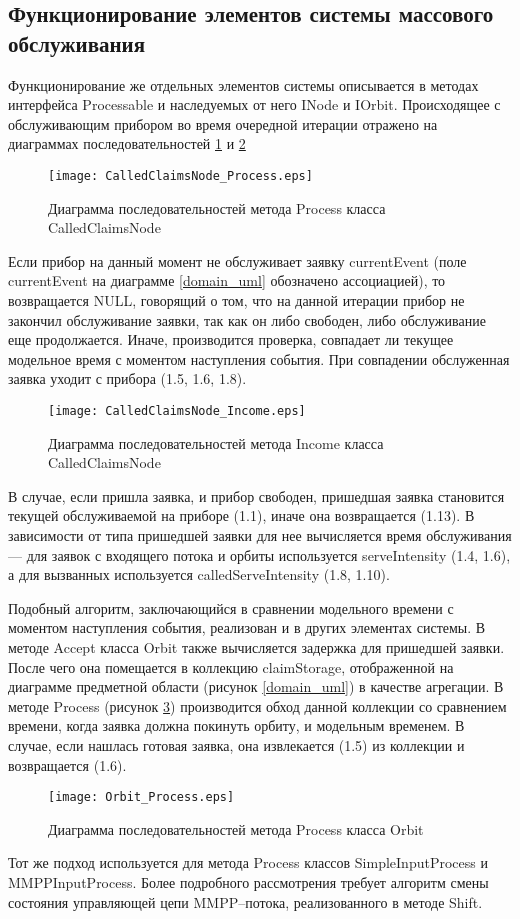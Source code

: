 \subsection{Функционирование элементов системы массового обслуживания}
Функционирование же отдельных элементов системы описывается в методах интерфейса Processable и наследуемых от него INode и IOrbit.
Происходящее с обслуживающим прибором во время очередной итерации отражено на диаграммах последовательностей \ref{CalledClaimsNode_Process_uml} и \ref{CalledClaimsNode_Income_uml}
\begin{figure}[H]
	\centering
	\texttt{[image: CalledClaimsNode\_Process.eps]}
	\caption{Диаграмма последовательностей метода Process класса CalledClaimsNode}
	\label{CalledClaimsNode_Process_uml}
\end{figure}
Если прибор на данный момент не обслуживает заявку currentEvent (поле currentEvent на диаграмме \ref{domain_uml} обозначено ассоциацией), то возвращается NULL, говорящий о том, что на данной итерации прибор не закончил обслуживание заявки, так как он либо свободен, либо обслуживание еще продолжается. Иначе, производится проверка, совпадает ли текущее модельное время с моментом наступления события. При совпадении обслуженная заявка уходит с прибора (1.5, 1.6, 1.8).
\begin{figure}[H]
	\centering
	\texttt{[image: CalledClaimsNode\_Income.eps]}
	\caption{Диаграмма последовательностей метода Income класса CalledClaimsNode}
	\label{CalledClaimsNode_Income_uml}
\end{figure}
В случае, если пришла заявка, и прибор свободен, пришедшая заявка становится текущей обслуживаемой на приборе (1.1), иначе она возвращается (1.13). В зависимости от типа пришедшей заявки для нее вычисляется время обслуживания --- для заявок с входящего потока и орбиты используется serveIntensity (1.4, 1.6), а для  вызванных используется calledServeIntensity (1.8, 1.10).

Подобный алгоритм, заключающийся в сравнении модельного времени с моментом наступления события, реализован и в других элементах системы.
В методе Accept класса Orbit также вычисляется задержка для пришедшей заявки. После чего она помещается в коллекцию claimStorage, отображенной на диаграмме предметной области (рисунок \ref{domain_uml}) в качестве агрегации. В методе Process (рисунок \ref{Orbit_Process_uml}) производится обход данной коллекции со сравнением времени, когда заявка должна покинуть орбиту, и модельным временем. В случае, если нашлась готовая заявка, она извлекается (1.5) из коллекции и возвращается (1.6).
 \begin{figure}[H]
 	\centering
 	\texttt{[image: Orbit\_Process.eps]}
 	\caption{Диаграмма последовательностей метода Process класса Orbit}
 	\label{Orbit_Process_uml}
 \end{figure}
Тот же подход используется для метода Process классов SimpleInputProcess и \\ MMPPInputProcess. Более подробного рассмотрения требует алгоритм смены состояния управляющей цепи MMPP--потока, реализованного в методе Shift.

